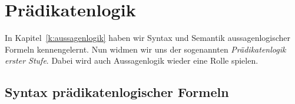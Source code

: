 \Tut\chapter{Pr\"adikatenlogik}
\label{k:praedikatenlogik}

In Kapitel~\ref{k:aussagenlogik} haben wir Syntax und Semantik
aussagenlogischer Formeln kennengelernt.
%
Nun widmen wir uns der sogenannten \emph{Prädikatenlogik erster Stufe}.
%
Dabei wird auch Aussagenlogik wieder eine Rolle spielen. 

\Tut\section{Syntax pr\"adikatenlogischer Formeln}
\label{sec:praedikatenlogik-syntax}

